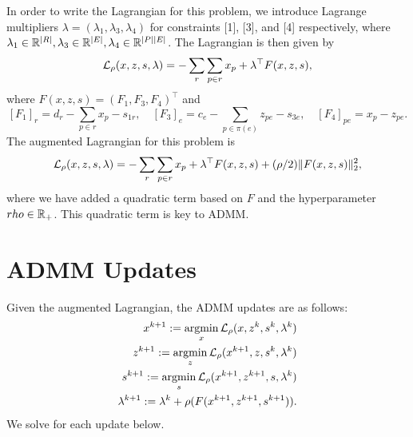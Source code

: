 \documentclass[11pt]{article}
\begin{document}
In order to write the Lagrangian for this problem,
we introduce Lagrange multipliers
$\lambda = (\lambda_{1},\lambda_{3},\lambda_{4})$
for constraints [1], [3], and [4] respectively,
where $\lambda_1\in\mathbb{R}^{|R|},\lambda_3\in\mathbb{R}^{|E|},\lambda_4\in\mathbb{R}^{|P||E|}$.
The Lagrangian is then given by
\begin{equation}
    \label{eqn:network-lagrangian-std}
    \mathcal{L}_\rho(x,z,s,\lambda) =-\sum_r\sum_{p\in r} x_p + \lambda^\top F(x,z,s),
\end{equation}
where $F(x,z,s) = (F_1, F_3,F_4)^\top$ and
$$
[F_1]_r = d_r - \sum_{p \in r}x_p - s_{1r},\quad
[F_3]_e = c_e - \sum_{p\in\pi(e)} z_{pe} - s_{3e},\quad
[F_4]_{pe} = x_p - z_{pe}.
$$
The augmented Lagrangian for this problem is
\begin{equation}
    \label{eqn:network-lagrangian}
    \mathcal{L}_\rho(x,z,s,\lambda) =-\sum_r\sum_{p\in r} x_p + \lambda^\top F(x,z,s)
        + (\rho/2)\| F(x,z,s) \|_2^2,
\end{equation}
where we have added a quadratic term based on $F$ and the hyperparameter $rho\in\mathbb{R}_+$.
This quadratic term is key to ADMM.

\section{ADMM Updates}
Given the augmented Lagrangian, the ADMM updates are as follows:
\begin{equation}
    \begin{aligned}
        x^{k+1} := \operatorname*{argmin}_{x} \mathcal{L}_\rho(x,z^k,s^{k},\lambda^k)\\
        z^{k+1} := \operatorname*{argmin}_{z} \mathcal{L}_\rho(x^{k+1},z,s^{k},\lambda^k)\\
        s^{k+1} := \operatorname*{argmin}_{s} \mathcal{L}_\rho(x^{k+1},z^{k+1},s,\lambda^k)\\
        \lambda^{k+1} := \lambda^k + \rho(F(x^{k+1},z^{k+1},s^{k+1})).
    \end{aligned}
\end{equation}
We solve for each update below.
\end{document}
